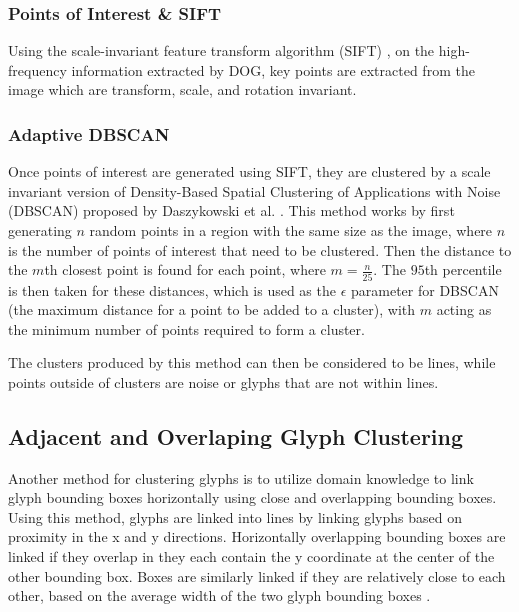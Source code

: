 \subsubsection{Points of Interest \& SIFT}

Using the scale-invariant feature transform algorithm (SIFT) \cite{Lowe}, on the high-frequency information extracted by DOG, key points are extracted from the image which are transform, scale, and rotation invariant.


\subsubsection{Adaptive DBSCAN}

Once points of interest are generated using SIFT, they are clustered by a scale invariant version of Density-Based Spatial Clustering of Applications with Noise (DBSCAN) \cite{Ester} proposed by Daszykowski et al. \cite{Daszykowski}. This method works by first generating $n$ random points in a region with the same size as the image, where $n$ is the number of points of interest that need to be clustered. Then the distance to the $m$th closest point is found for each point, where $m = \frac{n}{25}$. The $95$th percentile is then taken for these distances, which is used as the $\epsilon$ parameter for DBSCAN (the maximum distance for a point to be added to a cluster), with $m$ acting as the minimum number of points required to form a cluster.

The clusters produced by this method can then be considered to be lines, while points outside of clusters are noise or glyphs that are not within lines.

\subsection{Adjacent and Overlaping Glyph Clustering}

Another method for clustering glyphs is to utilize domain knowledge to link glyph bounding boxes horizontally using close and overlapping bounding boxes. Using this method, glyphs are linked into lines by linking glyphs based on proximity in the x and y directions. Horizontally overlapping bounding boxes are linked if they overlap in they each contain the y coordinate at the center of the other bounding box. Boxes are similarly linked if they are relatively close to each other, based on the average width of the two glyph bounding boxes .


